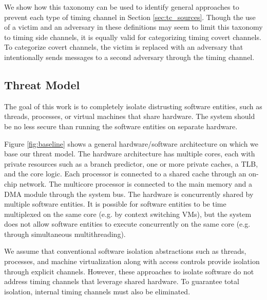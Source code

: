 We show how this taxonomy can be used to identify general approaches to prevent 
each type of timing channel in Section \ref{sec:tc_sources}. Though the use of 
a victim and an adversary in these definitions may seem to limit this taxonomy 
to timing side channels, it is equally valid for categorizing timing covert 
channels. To categorize covert channels, the victim is replaced with an 
adversary that intentionally sends messages to a second adversary through the 
timing channel.

\subsection{Threat Model}
The goal of this work is to completely isolate distrusting software entities, 
such as threads, processes, or virtual machines that share
hardware. The system should be no less secure than running the software 
entities on separate hardware. 

Figure \ref{fig:baseline} shows a general hardware/software architecture on 
which we base our threat model. The hardware architecture has multiple cores, 
each with private resources such as a branch predictor, one or more private 
caches, a TLB, and the core logic. Each processor is connected to a shared 
cache through an on-chip network. The multicore processor is connected to the 
main memory and a DMA module through the system bus. The hardware is 
concurrently shared by multiple software entities. It is possible for software 
entities to be time multiplexed on the same core (e.g.  by context switching 
VMs), but the system does not allow software entities to execute concurrently 
on the same core (e.g. through simultaneous multithreading).

We assume that conventional software isolation abstractions such as threads, 
processes, and machine virtualization along with access controls provide 
isolation through explicit channels. However, these approaches to isolate 
software do not address timing channels that leverage shared hardware. To 
guarantee total isolation, internal timing channels must also be eliminated.


